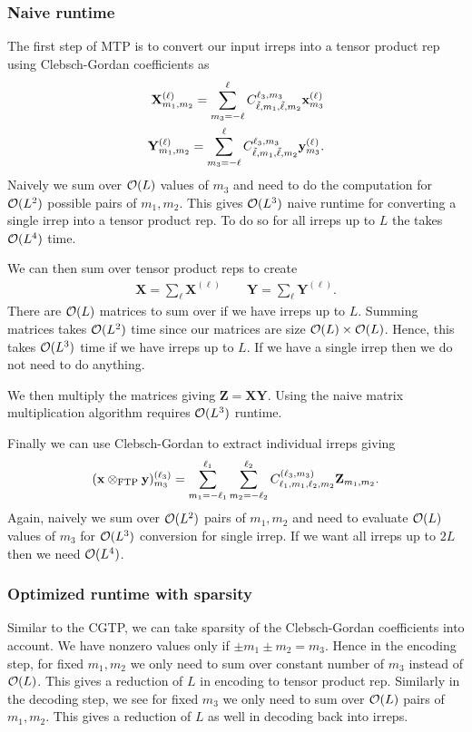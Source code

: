 \subsubsection{Naive runtime}
The first step of MTP is to convert our input irreps into a tensor product rep using Clebsch-Gordan coefficients as
\begin{align}
    \mathbf{X}^{(\ell)}_{m_1,m_2} = \sum_{m_3=-\ell}^{\ell} C^{\ell_3,m_3}_{\tilde{\ell},m_1,\tilde{\ell},m_2}\mathbf{x}^{(\ell_{})}_{m_3}\\
    \mathbf{Y}^{(\ell)}_{m_1,m_2} = \sum_{m_3=-\ell}^{\ell} C^{\ell_3,m_3}_{\tilde{\ell},m_1,\tilde{\ell},m_2}\mathbf{y}^{(\ell_{})}_{m_3}.
\end{align}
Naively we sum over $\mathcal{O}(L)$ values of $m_3$ and need to do the computation for $\mathcal{O}(L^2)$ possible pairs of $m_1,m_2$. This gives $\mathcal{O}(L^3)$ naive runtime for converting a single irrep into a tensor product rep. To do so for all irreps up to $L$ the takes $\mathcal{O}(L^4)$ time.

We can then sum over tensor product reps to create 
\begin{align}
    \mathbf{X}=\sum_{\ell}\mathbf{X}^{(\ell)}\qquad
    \mathbf{Y}=\sum_{\ell}\mathbf{Y}^{(\ell)}.
\end{align}
There are $\mathcal{O}(L)$ matrices to sum over if we have irreps up to $L$. Summing matrices takes $\mathcal{O}(L^2)$ time since our matrices are size $\mathcal{O}(L)\times \mathcal{O}(L)$. Hence, this takes $\mathcal{O}(L^3)$ time if we have irreps up to $L$. If we have a single irrep then we do not need to do anything.

We then multiply the matrices giving $\mathbf{Z}=\mathbf{X}\mathbf{Y}$. Using the naive matrix multiplication algorithm requires $\mathcal{O}(L^3)$ runtime.

Finally we can use Clebsch-Gordan to extract individual irreps giving
\begin{align}
    (\mathbf{x}\otimes_{\mathrm{FTP}}\mathbf{y})^{(\ell_3)}_{m_3}=\sum_{m_1=-\ell_1}^{\ell_1}\sum_{m_2=-\ell_2}^{\ell_2} C^{(\ell_3,m_3)}_{\ell_1,m_1,\ell_2,m_2}\mathbf{Z}_{m_1,m_2}.
\end{align}
Again, naively we sum over $\mathcal{O}(L^2)$ pairs of $m_1,m_2$ and need to evaluate $\mathcal{O}(L)$ values of $m_3$ for $\mathcal{O}(L^3)$ conversion for single irrep. If we want all irreps up to $2L$ then we need $\mathcal{O}(L^4)$.

\subsubsection{Optimized runtime with sparsity}
Similar to the CGTP, we can take sparsity of the Clebsch-Gordan coefficients into account. We have nonzero values only if $\pm m_1\pm m_2=m_3$. Hence in the encoding step, for fixed $m_1,m_2$ we only need to sum over constant number of $m_3$ instead of $\mathcal{O}(L)$. This gives a reduction of $L$ in encoding to tensor product rep. Similarly in the decoding step, we see for fixed $m_3$ we only need to sum over $\mathcal{O}(L)$ pairs of $m_1,m_2$. This gives a reduction of $L$ as well in decoding back into irreps.


